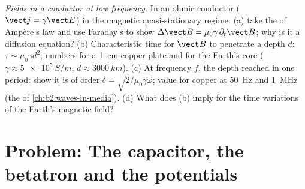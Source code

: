\begin{exercise}[$\star\star\star$]\label{exo:b2:maxwell-equations:12}
\emph{Fields in a conductor at low frequency.} In an ohmic conductor
($\vect j = \gamma\vect E$) in the magnetic quasi-stationary regime: (a) take
the  of Ampère's law and use Faraday's to show $\Delta\vect B = \mu_0\gamma\,
\partial_t\vect B$; why is it a diffusion equation? (b) Characteristic time
for $\vect B$ to penetrate a depth $d$: $\tau \sim \mu_0\gamma d^2$; numbers for a
\qty{1}{cm} copper plate and for the Earth's core ($\gamma \approx \qty{5e5}{S/m}$,
$d \approx \qty{3000}{km}$). (c) At frequency $f$, the depth reached in one
period: show it is of order $\delta = \sqrt{2/\mu_0\gamma\omega}$; value for copper
at \qty{50}{Hz} and \qty{1}{MHz} (the  of
\cref{ch:b2:waves-in-media}). (d) What does (b) imply for the time
variations of the Earth's magnetic field?
\end{exercise}

\section{Problem: The capacitor, the betatron and the potentials}

